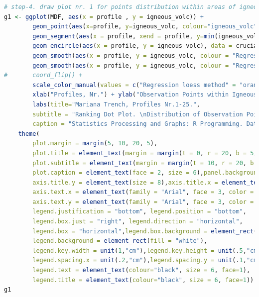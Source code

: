 \documentclass[pdflatex,compress,10pt,
	xcolor={dvipsnames,dvipsnames,svgnames,x11names,table},
	hyperref={colorlinks = true,breaklinks = true, urlcolor = NavyBlue, breaklinks = true}]{beamer}
\begin{document}
\begin{frame}[fragile,shrink=20,]
\begin{lstlisting}[language=R]
	# step-4. draw plot nr. 1 for points distribution within areas of igneous volcanic zones by bathymetric profiles
g1 <- ggplot(MDF, aes(x = profile , y = igneous_volc)) +   
		geom_point(aes(x=profile, y=igneous_volc, colour="igneous_volc"), size=3, alpha = .5, show.legend=TRUE) + # Draw points  
		geom_segment(aes(x = profile, xend = profile, y=min(igneous_volc), yend=max(igneous_volc)),linetype="dashed", size=0.1) +   # Draw dashed lines    
	  	geom_encircle(aes(x = profile, y = igneous_volc), data = crucial_igneous, color="red", size=1, expand=0.05) +   # encircle 
		geom_smooth(aes(x = profile, y = igneous_volc, colour = "Regression loess method"), method = loess, se = FALSE, size = .3, linetype = "solid", span = 1, show.legend=TRUE) +
		geom_smooth(aes(x = profile, y = igneous_volc, colour = "Regression lm method"), method = lm, formula = y ~ splines::bs(x, 3), se = FALSE, size=.3, linetype = "solid", show.legend=TRUE) +
#	  	coord_flip() +	   
		scale_color_manual(values = c("Regression loess method" = "orange", "Regression lm method" = "blue", "igneous_volc" = "royalblue1")) +  
		xlab("Profiles, Nr.") + ylab("Observation Points within Igneous Areas") + 
		labs(title="Mariana Trench, Profiles Nr.1-25.", 
		subtitle = "Ranking Dot Plot. \nDistribution of Observation Points across Igneous Volcanic Areas",
		caption = "Statistics Processing and Graphs: R Programming. Data Source: QGIS") +
	theme(
		plot.margin = margin(5, 10, 20, 5),
		plot.title = element_text(margin = margin(t = 0, r = 20, b = 5, l = 0), family = "Kai", face = "bold", size = 12), 
		plot.subtitle = element_text(margin = margin(t = 10, r = 20, b = 10, l = 0), family = "Hei", face = "bold", size = 10), 
		plot.caption = element_text(face = 2, size = 6),panel.background=ggplot2::element_rect(fill = "white"),
		axis.title.y = element_text(size = 8),axis.title.x = element_text(size = 8),
		axis.text.x = element_text(family = "Arial", face = 3, color = "gray24",size = 8, angle = 15),
    	axis.text.y = element_text(family = "Arial", face = 3, color = "gray24",size = 8, angle = 90),
		legend.justification = "bottom", legend.position = "bottom",
		legend.box.just = "right", legend.direction = "horizontal",
		legend.box = "horizontal",legend.box.background = element_rect(colour = "honeydew4",size=0.2),
		legend.background = element_rect(fill = "white"),
		legend.key.width = unit(1,"cm"),legend.key.height = unit(.5,"cm"),
		legend.spacing.x = unit(.2,"cm"),legend.spacing.y = unit(.1,"cm"),
		legend.text = element_text(colour="black", size = 6, face=1),
		legend.title = element_text(colour="black", size = 6, face=1))
g1
\end{lstlisting}
\end{frame}
\end{document}
